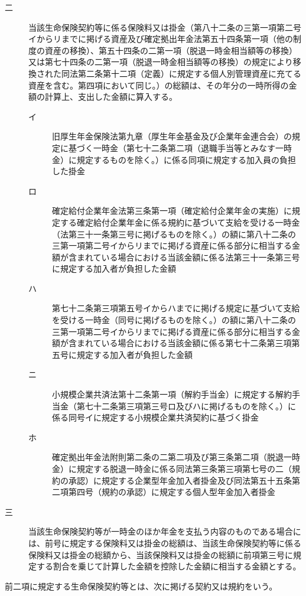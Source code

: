 \documentclass[twocolumn,a4j,10pt]{ltjtarticle}
\begin{document}
\begin{description}
\begin{description}
\item[二]当該生命保険契約等に係る保険料又は掛金（第八十二条の三第一項第二号イからリまでに掲げる資産及び確定拠出年金法第五十四条第一項（他の制度の資産の移換）、第五十四条の二第一項（脱退一時金相当額等の移換）又は第七十四条の二第一項（脱退一時金相当額等の移換）の規定により移換された同法第二条第十二項（定義）に規定する個人別管理資産に充てる資産を含む。第四項において同じ。）の総額は、その年分の一時所得の金額の計算上、支出した金額に算入する。
\begin{description}
\item[イ]旧厚生年金保険法第九章（厚生年金基金及び企業年金連合会）の規定に基づく一時金（第七十二条第二項（退職手当等とみなす一時金）に規定するものを除く。）に係る同項に規定する加入員の負担した掛金
\item[ロ]確定給付企業年金法第三条第一項（確定給付企業年金の実施）に規定する確定給付企業年金に係る規約に基づいて支給を受ける一時金（法第三十一条第三号に掲げるものを除く。）の額に第八十二条の三第一項第二号イからリまでに掲げる資産に係る部分に相当する金額が含まれている場合における当該金額に係る法第三十一条第三号に規定する加入者が負担した金額
\item[ハ]第七十二条第三項第五号イからハまでに掲げる規定に基づいて支給を受ける一時金（同号に掲げるものを除く。）の額に第八十二条の三第一項第二号イからリまでに掲げる資産に係る部分に相当する金額が含まれている場合における当該金額に係る第七十二条第三項第五号に規定する加入者が負担した金額
\item[ニ]小規模企業共済法第十二条第一項（解約手当金）に規定する解約手当金（第七十二条第三項第三号ロ及びハに掲げるものを除く。）に係る同号イに規定する小規模企業共済契約に基づく掛金
\item[ホ]確定拠出年金法附則第二条の二第二項及び第三条第二項（脱退一時金）に規定する脱退一時金に係る同法第三条第三項第七号の二（規約の承認）に規定する企業型年金加入者掛金及び同法第五十五条第二項第四号（規約の承認）に規定する個人型年金加入者掛金
\end{description}
\item[三]当該生命保険契約等が一時金のほか年金を支払う内容のものである場合には、前号に規定する保険料又は掛金の総額は、当該生命保険契約等に係る保険料又は掛金の総額から、当該保険料又は掛金の総額に前項第三号に規定する割合を乗じて計算した金額を控除した金額に相当する金額とする。
\end{description}
\item[\rensuji{3}]前二項に規定する生命保険契約等とは、次に掲げる契約又は規約をいう。
\begin{description}

\end{description}
\end{description}
\end{document}
